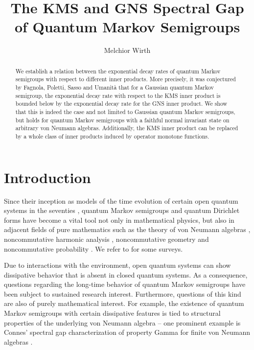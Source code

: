 \documentclass[a4paper,12pt]{amsart}
\title{The KMS and GNS Spectral Gap of Quantum Markov Semigroups}
\author{Melchior Wirth}
\date{}
\theoremstyle{plain}
\theoremstyle{remark}
\theoremstyle{definition}
\begin{document}
\begin{abstract}
    We establish a relation between the exponential decay rates of quantum Markov semigroups with respect to different inner products. More precisely, it was conjectured by Fagnola, Poletti, Sasso and Umanità that for a Gaussian quantum Markov semigroup, the exponential decay rate with respect to the KMS inner product is bounded below by the exponential decay rate for the GNS inner product. We show that this is indeed the case and not limited to Gaussian quantum Markov semigroups, but holds for quantum Markov semigroups with a faithful normal invariant state on arbitrary von Neumann algebras. Additionally, the KMS inner product can be replaced by a whole class of inner products induced by operator monotone functions.
\end{abstract}

\maketitle


\section{Introduction}

Since their inception as models of the time evolution of certain open quantum systems in the seventies \cite{Lin76,GKS76,AL87}, quantum Markov semigroups and quantum Dirichlet forms have become a vital tool not only in mathematical physics, but also in adjacent fields of pure mathematics such as the theory of von Neumann algebras \cite{Pet09a,Pet09b,CS15,CS17}, noncommutative harmonic analysis \cite{MLX06,JM10,JM12,HJ24}, noncommutative geometry \cite{DR89,CS03,CS09} and noncommutative probability \cite{HP84,VS84,Bia03,CFK14}. We refer to \cite{Fag99,Cip08,Cip23} for some surveys.

Due to interactions with the environment, open quantum systems can show dissipative behavior that is absent in closed quantum systems. As a consequence, questions regarding the long-time behavior of quantum Markov semigroups have been subject to sustained research interest. Furthermore, questions of this kind are also of purely mathematical interest. For example, the existence of quantum Markov semigroups with certain dissipative features is tied to structural properties of the underlying von Neumann algebra -- one prominent example is Connes' spectral gap characterization of property Gamma for finite von Neumann algebras \cite{Con76}.
\end{document}
